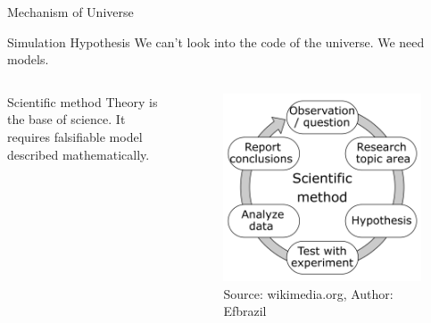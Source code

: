 \documentclass[xcolor]{beamer}
\begin{document}
\begin{frame}{Mechanism of Universe}
\begin{block}{Simulation Hypothesis}
We can't look into the code of the universe. We need models.
\end{block}

\begin{columns}
\begin{column}{0.5\textwidth}
\begin{block}{Scientific method}
Theory is the base of science. It requires falsifiable model described mathematically.
\end{block}
\end{column}

\begin{column}{0.5\textwidth}
\begin{figure}
\includegraphics[width=\textwidth]{The_Scientific_Method.png}
\caption{Source: wikimedia.org, Author:  	Efbrazil}
\end{figure}
\end{column}
\end{columns}
\end{frame}
\end{document}
